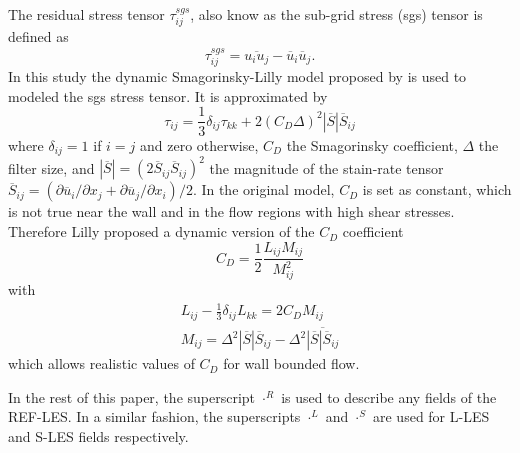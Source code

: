 The residual stress tensor $\tau_{ij}^{sgs}$, also know as the sub-grid stress (sgs) tensor is defined as
\begin{equation}
\tau_{ij}^{sgs}=\overline{u_i u_j}-\overline{u}_i\overline{u}_j.
\end{equation}
In this study the dynamic Smagorinsky-Lilly model proposed by \textcite{Lilly1992} is used to modeled the sgs stress tensor. It is approximated by
\begin{equation}\label{equ: sgs model}
\tau_{ij}=\frac{1}{3}\delta_{ij}\tau_{kk}+2(C_{D}\Delta)^2\left| \overline{S} \right|\overline{S}_{ij}
\end{equation}
where $\delta_{ij}=1$ if $i=j$ and zero otherwise, $C_{D}$ the Smagorinsky coefficient, $\Delta$ the filter size, and $\left|\overline{S}\right|=(2\overline{S}_{ij}\overline{S}_{ij})^2$ the magnitude of the stain-rate tensor $\overline{S}_{ij}=\left(\partial\overline{u}_i/\partial  x_j+\partial\overline{u}_j/\partial x_i \right)/2$. In the original model, $C_{D}$ is set as constant, which is not true near the wall and in the flow regions with  high shear stresses. Therefore Lilly proposed a dynamic version of the $C_D$ coefficient
\begin{equation}
C_D=\frac{1}{2}\frac{L_{ij}M_{ij}}{M_{ij}^2}
\label{equ: dynamic Cd coefficient}
\end{equation}
with
\begin{subequations}\label{subequ: Lij and Mij}
	\begin{gather}
		L_{ij}-\frac{1}{3}\delta_{ij}L_{kk}=2C_{D}M_{ij}
		\label{equ: Lij}
		\\
		M_{ij}=\Delta^2\left| \overline{S} \right|\overline{S}_{ij}-\Delta^2\overline{\left| \overline{S} \right|\overline{S}_{ij}}
		\label{equ: Mij}
	\end{gather}
\end{subequations}
which allows realistic values of $C_D$ for wall bounded flow. 

In the rest of this paper, the superscript $\cdot^R$ is used to describe any fields of the REF-LES. In a similar fashion, the superscripts $\cdot^L$ and $\cdot^S$ are used for L-LES and S-LES fields respectively.

